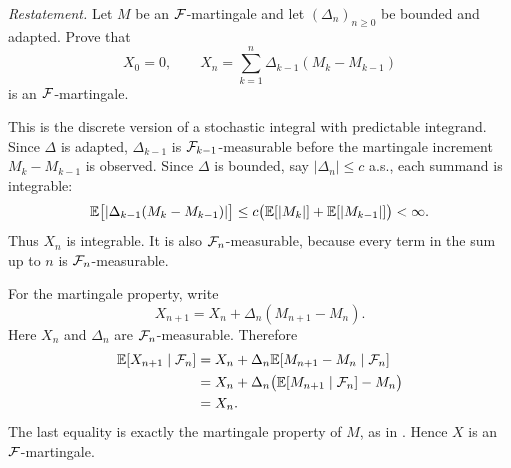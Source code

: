 \begin{exercise}
\emph{Restatement.}  Let \(M\) be an \(\mathcal{F}\)-martingale and let
\((\Delta_n)_{n\ge 0}\) be bounded and adapted.  Prove that
\[
  X_0=0,\qquad
  X_n=\sum_{k=1}^n \Delta_{k-1}(M_k-M_{k-1})
\]
is an \(\mathcal{F}\)-martingale.
\end{exercise}

\begin{solution}
This is the discrete version of a stochastic integral with predictable
integrand.  Since \(\Delta\) is adapted, \(\Delta_{k-1}\) is
\(\mathcal{F}_{k-1}\)-measurable before the martingale increment
\(M_k-M_{k-1}\) is observed.  Since \(\Delta\) is bounded, say
\(|\Delta_n|\le c\) a.s., each summand is integrable:
\[
  \mathbb{E}\bigl[|\Delta_{k-1}(M_k-M_{k-1})|\bigr]
    \le c\bigl(\mathbb{E}[|M_k|]+\mathbb{E}[|M_{k-1}|]\bigr)<\infty .
\]
Thus \(X_n\) is integrable.  It is also \(\mathcal{F}_n\)-measurable, because every
term in the sum up to \(n\) is \(\mathcal{F}_n\)-measurable.

For the martingale property, write
\[
  X_{n+1}=X_n+\Delta_n(M_{n+1}-M_n).
\]
Here \(X_n\) and \(\Delta_n\) are \(\mathcal{F}_n\)-measurable.  Therefore
\[
\begin{aligned}
  \mathbb{E}[X_{n+1}\mid \mathcal{F}_n]
    &=X_n+\Delta_n\mathbb{E}[M_{n+1}-M_n\mid \mathcal{F}_n]  \\
    &=X_n+\Delta_n\bigl(\mathbb{E}[M_{n+1}\mid \mathcal{F}_n]-M_n\bigr) \\
    &=X_n.
\end{aligned}
\]
The last equality is exactly the martingale property of \(M\), as in
.  Hence \(X\) is an \(\mathcal{F}\)-martingale.
\end{solution}
